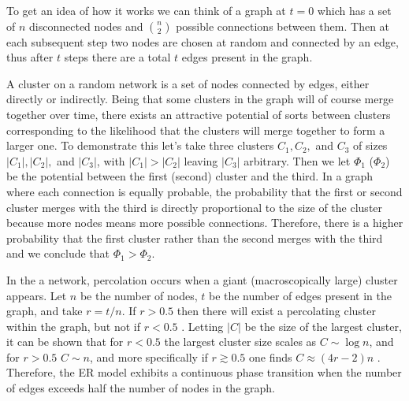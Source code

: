 To get an idea of how it works we can think of a graph at $t = 0$ which has a set of $n$ disconnected nodes and ${n \choose 2}$ possible connections between them.
Then at each subsequent step two nodes are chosen at random and connected by an edge, thus after $t$ steps there are a total $t$ edges present in the graph.

A cluster on a random network is a set of nodes connected by edges, either directly or indirectly.
Being that some clusters in the graph will of course merge together over time, there exists an attractive potential of sorts between clusters corresponding to the likelihood that the clusters will merge together to form a larger one.
To demonstrate this let's take three clusters $C_1, C_2,$ and $C_3$ of sizes $|C_1|, |C_2|,$ and $|C_3|$, with $|C_1| > |C_2|$ leaving $|C_3|$ arbitrary.
Then we let $\Phi_1$ ($\Phi_2$) be the potential between the first (second) cluster and the third.
In a graph where each connection is equally probable, the probability that the first or second cluster merges with the third is directly proportional to the size of the cluster because more nodes means more possible connections.
Therefore, there is a higher probability that the first cluster rather than the second merges with the third and we conclude that $\Phi_1 > \Phi_2$.

In the a network, percolation occurs when a giant (macroscopically large) cluster appears.
Let $n$ be the number of nodes, $t$ be the number of edges present in the graph, and take $r = t/n$.
If $r > 0.5$ then there will exist a percolating cluster within the graph, but not if $r < 0.5$ \cite{ER2}.
Letting $|C|$ be the size of the largest cluster, it can be shown that for $r < 0.5$ the largest cluster size scales as $C \sim \log n$, and for $r > 0.5$ $C \sim n$, and more specifically if $r \gtrsim 0.5$ one finds $C \approx (4r - 2)n$ \cite{ER2}.
Therefore, the ER model exhibits a continuous phase transition when the number of edges exceeds half the number of nodes in the graph.
